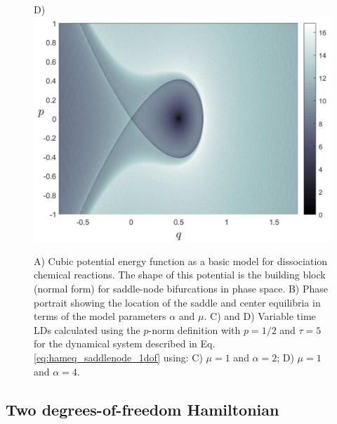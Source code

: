 \documentclass{ws-ijbc}
\begin{document}
\begin{figure}[htbp]
\begin{center}
		D)\includegraphics[scale=0.33]{fig4d}
	\end{center}
	\caption{A) Cubic potential energy function as a basic model for dissociation chemical reactions. The shape of this potential is the building block (normal form) for saddle-node bifurcations in phase space. B) Phase portrait showing the location of the saddle and center equilibria in terms of the model parameters $\alpha$ and $\mu$. C) and D) Variable time LDs calculated using the $p$-norm definition with $p = 1/2$ and $\tau = 5$ for the dynamical system described in Eq. \eqref{eq:hameq_saddlenode_1dof} using: C) $\mu = 1$ and $\alpha = 2$; D) $\mu = 1$ and $\alpha = 4$.}
	\label{ld_ps_1dof_alpha}
\end{figure} 


\subsection{Two degrees-of-freedom Hamiltonian}
\label{sec:HSN_2DOF}
\end{document}
